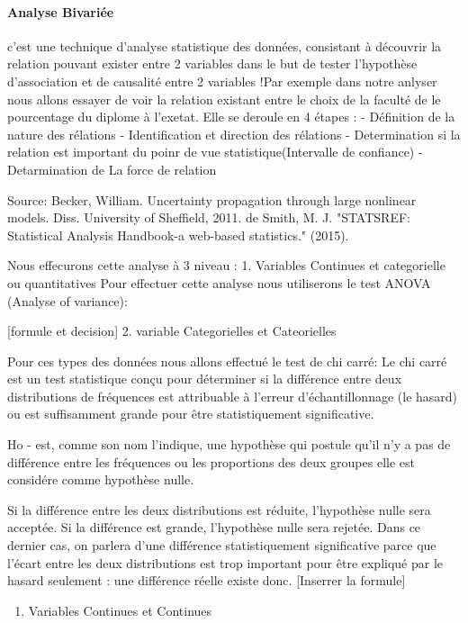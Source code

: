 \documentclass[11pt]{article}
\providecommand{\tightlist}{%
      \setlength{\itemsep}{0pt}\setlength{\parskip}{0pt}}
\begin{document}
    \paragraph{Analyse Bivariée}\label{analyse-bivariuxe9e}

    c'est une technique d'analyse statistique des données, consistant à
découvrir la relation pouvant exister entre 2 variables dans le but de
tester l'hypothèse d'association et de causalité entre 2 variables !Par
exemple dans notre anlyser nous allons essayer de voir la relation
existant entre le choix de la faculté de le pourcentage du diplome à
l'exetat. Elle se deroule en 4 étapes : - Définition de la nature des
rélations - Identification et direction des rélations - Determination si
la relation est important du poinr de vue statistique(Intervalle de
confiance) - Detarmination de La force de relation

Source: Becker, William. Uncertainty propagation through large nonlinear
models. Diss. University of Sheffield, 2011. de Smith, M. J. "STATSREF:
Statistical Analysis Handbook-a web-based statistics." (2015).

    Nous effecurons cette analyse à 3 niveau : 1. Variables Continues et
categorielle ou quantitatives Pour effectuer cette analyse nous
utiliserons le test ANOVA (Analyse of variance):


{[}formule et decision{]} 2. variable Categorielles et Cateorielles

Pour ces types des données nous allons effectué le test de chi carré: Le
chi carré est un test statistique conçu pour déterminer si la différence
entre deux distributions de fréquences est attribuable à l'erreur
d'échantillonnage (le hasard) ou est suffisamment grande pour être
statistiquement significative.

Ho - est, comme son nom l'indique, une hypothèse qui postule qu'il n'y a
pas de différence entre les fréquences ou les proportions des deux
groupes elle est considére comme hypothèse nulle.

Si la différence entre les deux distributions est réduite, l'hypothèse
nulle sera acceptée. Si la différence est grande, l'hypothèse nulle sera
rejetée. Dans ce dernier cas, on parlera d'une différence
statistiquement significative parce que l'écart entre les deux
distributions est trop important pour être expliqué par le hasard
seulement : une différence réelle existe donc. {[}Inserrer la formule{]}

\begin{enumerate}
\def\labelenumi{\arabic{enumi}.}
\setcounter{enumi}{2}
\tightlist
\item
  Variables Continues et Continues
\end{enumerate}
\end{document}
